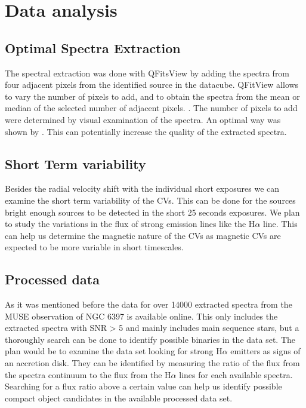 \section{Data analysis}

\subsection{Optimal Spectra Extraction}

The spectral extraction was done with QFitsView by adding the spectra from four adjacent pixels from the identified source in the datacube. QFitView allows to vary the number of pixels to add, and to obtain the spectra from the mean or median of the selected number of adjacent pixels. . The number of pixels to add were determined by visual examination of the spectra. An optimal way was shown by \cite{horne_emission_1986}. This can potentially increase the quality of the extracted spectra. 

\subsection{Short Term variability}

Besides the radial velocity shift with the individual short exposures we can examine the short term variability of the CVs. This can be done for the sources bright enough sources to be detected in the short 25 seconds exposures. We plan to study the variations in the flux of strong emission lines like the H$\alpha$ line. This can help us determine the magnetic nature of the CVs as magnetic CVs are expected to be more variable in short timescales. 

\subsection{Processed data}

As it was mentioned before the data for over 14000 extracted spectra from the MUSE observation of NGC 6397 is available online. This only includes the extracted spectra with SNR > 5 and mainly includes main sequence stars, but a thoroughly search can be done to identify possible binaries in the data set. The plan would be to examine the data set looking for strong H$\alpha$ emitters as signs of an accretion disk. They can be identified by measuring the ratio of the flux from the spectra continuum to the flux from the H$\alpha$ lines for each available spectra. Searching for a flux ratio above a certain value can help us identify possible compact object candidates in the available processed data set. 

